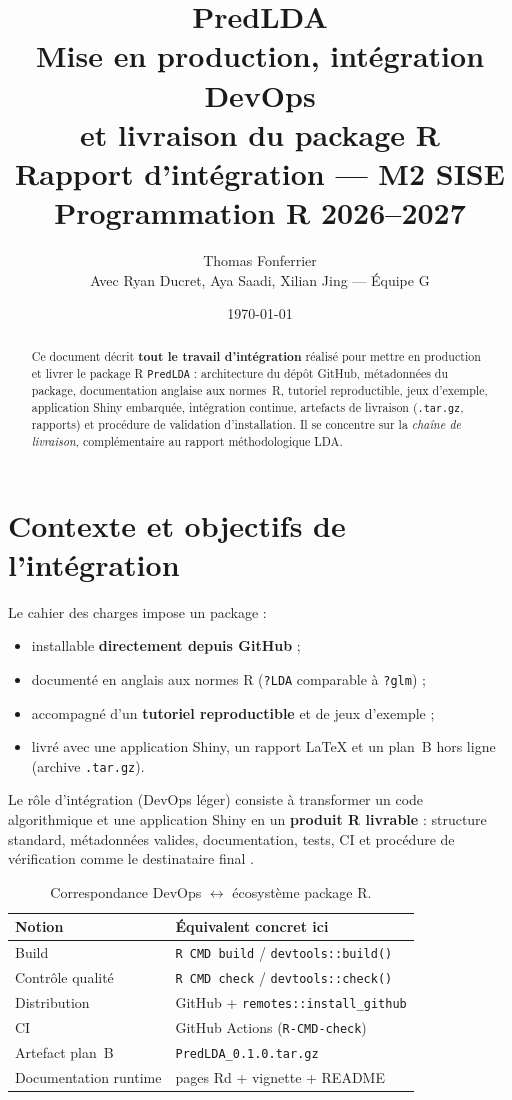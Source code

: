 \documentclass[11pt,a4paper]{article}
\title{%
  PredLDA\\[0.35em]
  \large Mise en production, int\'egration DevOps\\ et livraison du package R\\[0.4em]
  \normalsize Rapport d'int\'egration --- M2 SISE Programmation R 2026--2027}
\author{Thomas Fonferrier\\[0.2em]
{\small Avec Ryan Ducret, Aya Saadi, Xilian Jing --- \'Equipe G}}
\date{\today}
\begin{document}
\maketitle

\begin{abstract}
Ce document d\'ecrit \textbf{tout le travail d'int\'egration} r\'ealis\'e pour
mettre en production et livrer le package R \texttt{PredLDA} : architecture du
d\'ep\^ot GitHub, m\'etadonn\'ees du package, documentation anglaise aux normes~R,
tutoriel reproductible, jeux d'exemple, application Shiny embarqu\'ee,
int\'egration continue, artefacts de livraison (\texttt{.tar.gz}, rapports) et
proc\'edure de validation d'installation. Il se concentre sur la
\emph{cha\^ine de livraison}, compl\'ementaire au rapport m\'ethodologique LDA.
\end{abstract}

\tableofcontents
\vspace{1em}

\section{Contexte et objectifs de l'int\'egration}

Le cahier des charges impose un package :
\begin{itemize}[leftmargin=*]
  \item installable \textbf{directement depuis GitHub} ;
  \item document\'e en anglais aux normes R (\texttt{?LDA} comparable \`a \texttt{?glm}) ;
  \item accompagn\'e d'un \textbf{tutoriel reproductible} et de jeux d'exemple ;
  \item livr\'e avec une application Shiny, un rapport LaTeX et un plan~B hors
        ligne (archive \texttt{.tar.gz}).
\end{itemize}

Le r\^ole d'int\'egration (DevOps l\'eger) consiste \`a transformer un code
algorithmique et une application Shiny en un \textbf{produit R livrable} :
structure standard, m\'etadonn\'ees valides, documentation, tests, CI et
proc\'edure de v\'erification \og comme le destinataire final \fg{}.

\begin{table}[ht]
\centering
\small
\begin{tabular}{@{}lp{9.2cm}@{}}
\toprule
Notion & \'Equivalent concret ici \\
\midrule
Build & \texttt{R CMD build} / \texttt{devtools::build()} \\
Contr\^ole qualit\'e & \texttt{R CMD check} / \texttt{devtools::check()} \\
Distribution & GitHub + \texttt{remotes::install\_github} \\
CI & GitHub Actions (\texttt{R-CMD-check}) \\
Artefact plan~B & \texttt{PredLDA\_0.1.0.tar.gz} \\
Documentation runtime & pages Rd + vignette + README \\
\bottomrule
\end{tabular}
\caption{Correspondance DevOps $\leftrightarrow$ \'ecosyst\`eme package R.}
\end{table}
\end{document}
